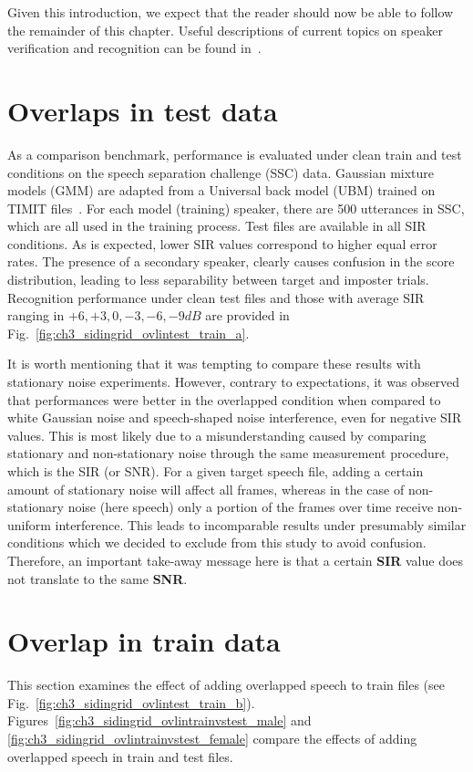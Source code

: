 Given this introduction, we expect that the reader should now be able to follow the remainder of this chapter. 
Useful descriptions of current topics on speaker verification and recognition can be found in~\cite{hansen2015SIDmagazine}. 


\section{Overlaps in test data}
\label{sec:ch3_OvlinTest}
As a comparison benchmark, performance is evaluated under clean train and test conditions on the speech separation challenge (SSC) data. 
Gaussian mixture models (GMM) are adapted from a Universal back model (UBM) trained on TIMIT files~\cite{msridentity}. 
For each model (training) speaker, there are 500 utterances in SSC, which are all used in the training process. Test files are available in all SIR conditions. 
As is expected, lower SIR values correspond to higher equal error rates. 
The presence of a secondary speaker, clearly causes confusion in the score distribution, leading to less separability between target and imposter trials. 
Recognition performance under clean test files and those with average SIR ranging in $+6, +3, 0, -3, -6, -9 dB$ are provided in Fig.~\ref{fig:ch3_sidingrid_ovlintest_train_a}. 

It is worth mentioning that it was tempting to compare these results with stationary noise experiments. 
However, contrary to expectations, it was observed that performances were better in the overlapped condition when compared to white Gaussian noise and speech-shaped noise interference, even for negative SIR values. 
This is most likely due to a misunderstanding caused by comparing stationary and non-stationary noise through the same measurement procedure, which is the SIR (or SNR). 
For a given target speech file, adding a certain amount of stationary noise will affect all frames, whereas in the case of non-stationary noise (here speech) only a portion of the frames over time receive non-uniform interference. 
This leads to incomparable results under presumably similar conditions which we decided to exclude from this study to avoid confusion. 
Therefore, an important take-away message here is that a certain {\bf SIR} value does not translate to the same {\bf SNR}. 


\section{Overlap in train data}
\label{sec:ch3_OvlinTrain}
This section examines the effect of adding overlapped speech to train files (see Fig.~\ref{fig:ch3_sidingrid_ovlintest_train_b}). 
Figures~\ref{fig:ch3_sidingrid_ovlintrainvstest_male} and \ref{fig:ch3_sidingrid_ovlintrainvstest_female} compare the effects of adding overlapped speech in train and test files. 


